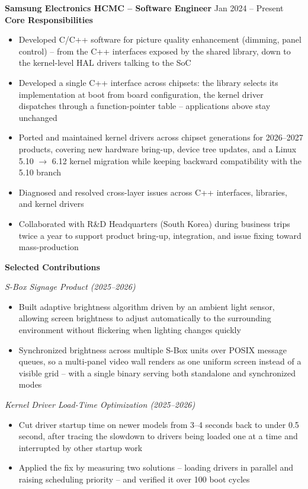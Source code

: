 \documentclass[a4paper,10pt]{article}
\newcommand{\project}[1]{\vspace{2pt}\textit{#1}\vspace{1pt}}
\begin{document}
\textbf{Samsung Electronics HCMC -- Software Engineer} \hfill Jan 2024 -- Present \\[2pt]
\textbf{Core Responsibilities}
\begin{itemize}
\item Developed C/C++ software for picture quality enhancement (dimming, panel control) -- from the C++ interfaces exposed by the shared library, down to
      the kernel-level HAL drivers talking to the SoC
\item Developed a single C++ interface across chipsets: the library
      selects its implementation at boot from board configuration, the kernel driver
      dispatches through a function-pointer table -- applications above stay unchanged
\item Ported and maintained kernel drivers across chipset generations for 2026--2027 products, covering new hardware bring-up, device tree updates, and a Linux 5.10 $\rightarrow$ 6.12 kernel migration while keeping backward compatibility with the 5.10 branch
\item Diagnosed and resolved cross-layer issues across C++ interfaces, libraries, and kernel drivers
\item Collaborated with R\&D Headquarters (South Korea) during business trips twice a year to support product bring-up, integration, and issue fixing toward mass-production
\end{itemize}

\vspace{2pt}
\textbf{Selected Contributions}

\project{S-Box Signage Product (2025--2026)}
\begin{itemize}
    \item Built adaptive brightness algorithm driven by an ambient light sensor, allowing screen
      brightness to adjust automatically to the surrounding environment without flickering
      when lighting changes quickly
    \item Synchronized brightness across multiple S-Box units over POSIX message queues, 
      so a multi-panel video wall renders as one uniform screen instead of a visible grid -- 
      with a single binary serving both standalone and synchronized modes
\end{itemize}

\project{Kernel Driver Load-Time Optimization (2025--2026)}
\begin{itemize}
    \item Cut driver startup time on newer models from 3--4 seconds back to under
          0.5 second, after tracing the slowdown to drivers being loaded one at a time
          and interrupted by other startup work
    \item Applied the fix by measuring two solutions -- loading drivers in parallel and
          raising scheduling priority -- and verified it over 100 boot cycles
\end{itemize}
\end{document}
